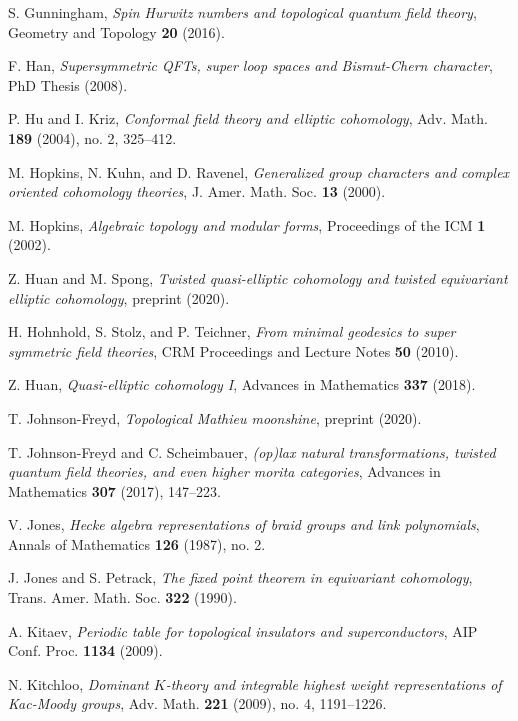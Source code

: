 \begin{description}[leftmargin=5.6em,labelwidth=5.2em,labelsep=0.4em,itemsep=0.5ex,parsep=0pt,topsep=0.8ex]
\item[\textbf{[Gun16]}] S. Gunningham, \textit{Spin Hurwitz numbers and topological quantum field theory}, Geometry and Topology \textbf{20} (2016).
\item[\textbf{[Han08]}] F. Han, \textit{Supersymmetric QFTs, super loop spaces and Bismut-Chern character}, PhD Thesis (2008).
\item[\textbf{[HK04]}] P. Hu and I. Kriz, \textit{Conformal field theory and elliptic cohomology}, Adv. Math. \textbf{189} (2004), no. 2, 325--412.
\item[\textbf{[HKR00]}] M. Hopkins, N. Kuhn, and D. Ravenel, \textit{Generalized group characters and complex oriented cohomology theories}, J. Amer. Math. Soc. \textbf{13} (2000).
\item[\textbf{[Hop02]}] M. Hopkins, \textit{Algebraic topology and modular forms}, Proceedings of the ICM \textbf{1} (2002).
\item[\textbf{[HS20]}] Z. Huan and M. Spong, \textit{Twisted quasi-elliptic cohomology and twisted equivariant elliptic cohomology}, preprint (2020).
\item[\textbf{[HST10]}] H. Hohnhold, S. Stolz, and P. Teichner, \textit{From minimal geodesics to super symmetric field theories}, CRM Proceedings and Lecture Notes \textbf{50} (2010).
\item[\textbf{[Hua18]}] Z. Huan, \textit{Quasi-elliptic cohomology I}, Advances in Mathematics \textbf{337} (2018).
\item[\textbf{[JF20]}] T. Johnson-Freyd, \textit{Topological Mathieu moonshine}, preprint (2020).
\item[\textbf{[JFS17]}] T. Johnson-Freyd and C. Scheimbauer, \textit{(op)lax natural transformations, twisted quantum field theories, and even higher morita categories}, Advances in Mathematics \textbf{307} (2017), 147--223.
\item[\textbf{[Jon87]}] V. Jones, \textit{Hecke algebra representations of braid groups and link polynomials}, Annals of Mathematics \textbf{126} (1987), no. 2.
\item[\textbf{[JP90]}] J. Jones and S. Petrack, \textit{The fixed point theorem in equivariant cohomology}, Trans. Amer. Math. Soc. \textbf{322} (1990).
\item[\textbf{[Kit09a]}] A. Kitaev, \textit{Periodic table for topological insulators and superconductors}, AIP Conf. Proc. \textbf{1134} (2009).
\item[\textbf{[Kit09b]}] N. Kitchloo, \textit{Dominant $K$-theory and integrable highest weight representations of Kac-Moody groups}, Adv. Math. \textbf{221} (2009), no. 4, 1191--1226.

\end{description}
